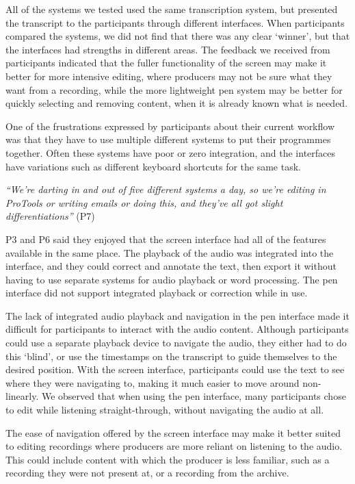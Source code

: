 All of the systems we tested used the same transcription system, but presented the transcript to the participants
through different interfaces. When participants compared the systems, we did not find that there was any clear
`winner', but that the interfaces had strengths in different areas. The feedback we received from participants
indicated that the fuller functionality of the screen may make it better for more intensive editing, where producers
may not be sure what they want from a recording, while the more lightweight pen system may be better for quickly
selecting and removing content, when it is already known what is needed.

One of the frustrations expressed by participants about their current workflow was that they have to use multiple
different systems to put their programmes together. Often these systems have poor or zero integration, and the
interfaces have variations such as different keyboard shortcuts for the same task.

\textit{``We're darting in and out of five different systems a day, so we're editing in ProTools or writing emails or
doing this, and they've all got slight differentiations''} (P7)

P3 and P6 said they enjoyed that the screen interface had all of the features available in the same place. The playback
of the audio was integrated into the interface, and they could correct and annotate the text, then export it without
having to use separate systems for audio playback or word processing. The pen interface did not support integrated
playback or correction while in use.

The lack of integrated audio playback and navigation in the pen interface made it difficult for participants to
interact with the audio content.  Although participants could use a separate playback device to navigate the audio,
they either had to do this `blind', or use the timestamps on the transcript to guide themselves to the desired
position. With the screen interface, participants could use the text to see where they were navigating to, making it
much easier to move around non-linearly.  We observed that when using the pen interface, many participants chose to
edit while listening straight-through, without navigating the audio at all.

The ease of navigation offered by the screen interface may make it better suited to editing recordings where producers
are more reliant on listening to the audio. This could include content with which the producer is less familiar, such
as a recording they were not present at, or a recording from the archive.

